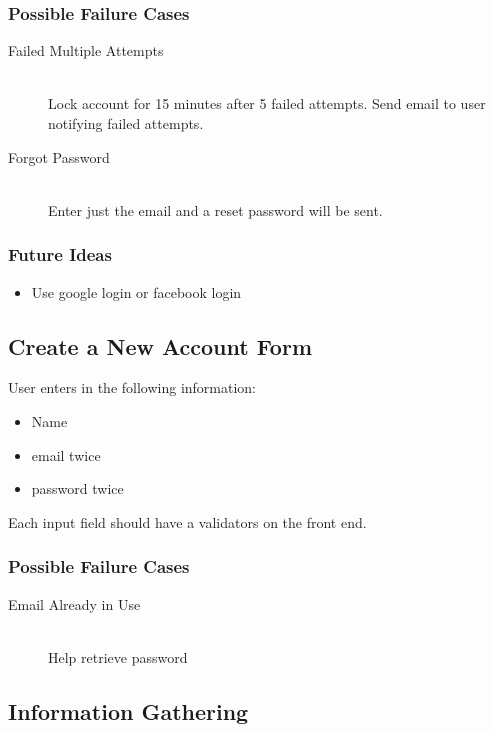 \documentclass[12pt]{article}
\begin{document}
\subsubsection{Possible Failure Cases}
\begin{description}
  \item[Failed Multiple Attempts] \hfill \\
    Lock account for 15 minutes after 5 failed attempts. Send email to user notifying failed attempts.
  \item[Forgot Password] \hfill \\
    Enter just the email and a reset password will be sent.
\end{description}

\subsubsection{Future Ideas}
\begin{itemize}
  \item Use google login or facebook login
\end{itemize}

\subsection{Create a New Account Form}

User enters in the following information:
\begin{itemize}
  \item Name
  \item email twice
  \item password twice
\end{itemize}

Each input field should have a validators on the front end.

\subsubsection{Possible Failure Cases}
\begin{description}
  \item[Email Already in Use] \hfill \\
    Help retrieve password
\end{description}

\subsection{Information Gathering}
\end{document}
